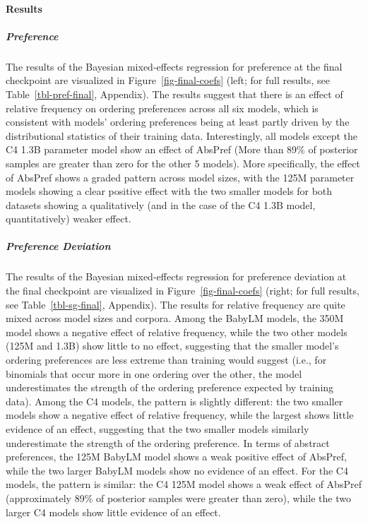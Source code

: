 \documentclass{article}
\begin{document}
\paragraph{Results}\label{results}

\subparagraph{Preference}\label{preference}

The results of the Bayesian mixed-effects regression for preference at
the final checkpoint are visualized in Figure~\ref{fig-final-coefs}
(left; for full results, see Table~\ref{tbl-pref-final}, Appendix). The
results suggest that there is an effect of relative frequency on
ordering preferences across all six models, which is consistent with
models' ordering preferences being at least partly driven by the
distributional statistics of their training data. Interestingly, all
models except the C4 1.3B parameter model show an effect of AbsPref
(More than 89\% of posterior samples are greater than zero for the other
5 models). More specifically, the effect of AbsPref shows a graded
pattern across model sizes, with the 125M parameter models showing a
clear positive effect with the two smaller models for both datasets
showing a qualitatively (and in the case of the C4 1.3B model,
quantitatively) weaker effect.

\subparagraph{Preference Deviation}\label{preference-deviation}

The results of the Bayesian mixed-effects regression for preference
deviation at the final checkpoint are visualized in
Figure~\ref{fig-final-coefs} (right; for full results, see
Table~\ref{tbl-sg-final}, Appendix). The results for relative frequency
are quite mixed across model sizes and corpora. Among the BabyLM models,
the 350M model shows a negative effect of relative frequency, while the
two other models (125M and 1.3B) show little to no effect, suggesting
that the smaller model's ordering preferences are less extreme than
training would suggest (i.e., for binomials that occur more in one
ordering over the other, the model underestimates the strength of the
ordering preference expected by training data). Among the C4 models, the
pattern is slightly different: the two smaller models show a negative
effect of relative frequency, while the largest shows little evidence of
an effect, suggesting that the two smaller models similarly
underestimate the strength of the ordering preference. In terms of
abstract preferences, the 125M BabyLM model shows a weak positive effect
of AbsPref, while the two larger BabyLM models show no evidence of an
effect. For the C4 models, the pattern is similar: the C4 125M model
shows a weak effect of AbsPref (approximately 89\% of posterior samples
were greater than zero), while the two larger C4 models show little
evidence of an effect.
\end{document}
